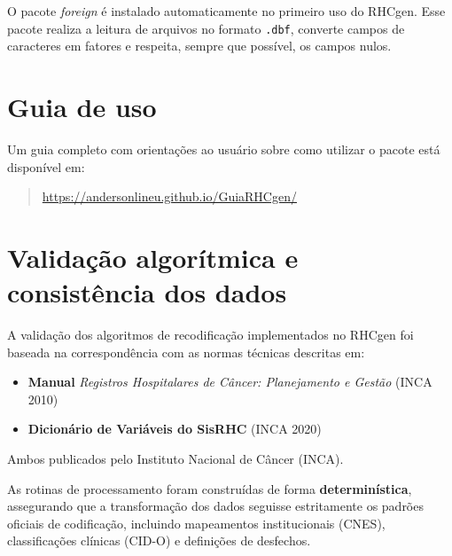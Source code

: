 \documentclass[
  brazilian,
  a4paper,
  oneside]{scrbook}
\providecommand{\tightlist}{%
  \setlength{\itemsep}{0pt}\setlength{\parskip}{0pt}}
\begin{document}
\begin{tcolorbox}[enhanced jigsaw, arc=.35mm, bottomrule=.15mm, bottomtitle=1mm, breakable, colback=white, colbacktitle=quarto-callout-note-color!10!white, colframe=quarto-callout-note-color-frame, coltitle=black, left=2mm, leftrule=.75mm, opacityback=0, opacitybacktitle=0.6, rightrule=.15mm, title=\textcolor{quarto-callout-note-color}{\faInfo}\hspace{0.5em}{Dependência automática}, titlerule=0mm, toprule=.15mm, toptitle=1mm]

O pacote \emph{foreign} é instalado automaticamente no primeiro uso do
RHCgen. Esse pacote realiza a leitura de arquivos no formato
\texttt{.dbf}, converte campos de caracteres em fatores e respeita,
sempre que possível, os campos nulos.

\end{tcolorbox}

\section{Guia de uso}\label{guia-de-uso}

Um guia completo com orientações ao usuário sobre como utilizar o pacote
está disponível em:

\begin{quote}
\url{https://andersonlineu.github.io/GuiaRHCgen/}
\end{quote}

\section{Validação algorítmica e consistência dos
dados}\label{validauxe7uxe3o-algoruxedtmica-e-consistuxeancia-dos-dados}

A validação dos algoritmos de recodificação implementados no RHCgen foi
baseada na correspondência com as normas técnicas descritas em:

\begin{itemize}
\tightlist
\item
  \textbf{Manual} \emph{Registros Hospitalares de Câncer: Planejamento e
  Gestão} (INCA 2010)
\item
  \textbf{Dicionário de Variáveis do SisRHC} (INCA 2020)
\end{itemize}

Ambos publicados pelo Instituto Nacional de Câncer (INCA).

As rotinas de processamento foram construídas de forma
\textbf{determinística}, assegurando que a transformação dos dados
seguisse estritamente os padrões oficiais de codificação, incluindo
mapeamentos institucionais (CNES), classificações clínicas (CID-O) e
definições de desfechos.
\end{document}
